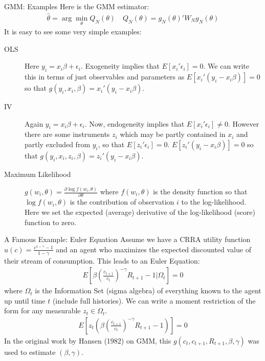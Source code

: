 \documentclass[aspectratio=169]{beamer}
\begin{document}
\begin{frame}{GMM: Examples}
Here is the GMM estimator:
\begin{eqnarray*}
\hat{\theta} = \arg \min_{\theta}  Q_N(\theta) \quad Q_N(\theta)=g_N(\theta)' W_N  g_N(\theta)
\end{eqnarray*}
It is easy to see some very simple examples:
\begin{description} 
\item[OLS] Here $y_i = x_i \beta + \epsilon_i$. Exogeneity implies that $E[x_i' \epsilon_i]=0$. We can write this in terms of just observables and parameters as $E[x_i' (y_i - x_i \beta)]=0$ so that $g(y_i,x_i, \beta) = x_i' (y_i - x_i \beta)$.
\item[IV]  Again $y_i = x_i \beta + \epsilon_i$. Now, endogeneity implies that $E[x_i' \epsilon_i]\neq0$. However there are some instruments $z_i$ which may be partly contained in $x_i$ and partly excluded from $y_i$, so that $E[z_i' \epsilon_i]=0$. $E[z_i' (y_i - x_i \beta)]=0$ so that $g(y_i,x_i,z_i, \beta) = z_i' (y_i - x_i \beta)$.
\item[Maximum Likelihood] $g(w_i,\theta) =  \frac{\partial \log f(w_i,\theta)}{\partial \theta}$ where $f(w_i,\theta)$ is the density function so that $\log f(w_i,\theta)$ is the contribution of observation $i$ to the log-likelihood. Here we set the expected (average) derivative of the log-likelihood (score) function to zero.
\end{description}
\end{frame}

\begin{frame}{A Famous Example: Euler Equation}
Assume we have a CRRA utility function $u(c) = \frac{c^{1-\gamma} -1}{1-\gamma}$ and an agent who maximizes the expected discounted value of their stream of consumption. This leads to an \alert{Euler Equation}:
\begin{eqnarray*}
E \left[\beta \left( \frac{c_{t+1}}{c_t} \right)^{-\gamma} R_{t+1} -1 | \Omega_t \right] =0
\end{eqnarray*}
where $\Omega_t$ is the \alert{Information Set} (sigma algebra) of everything known to the agent up until time $t$ (include full histories). We can write a moment restriction of the form for any measurable $z_t \in \Omega_t$.
\begin{eqnarray*}
E \left[z_t \left(\beta  \left( \frac{c_{t+1}}{c_t} \right)^{-\gamma} R_{t+1} -1\right) \right] =0
\end{eqnarray*}
In the original work by Hansen (1982) on GMM, this $g(c_t,c_{t+1},R_{t+1},\beta,\gamma)$ was used to estimate $(\beta,\gamma)$.
\end{frame}
\end{document}
